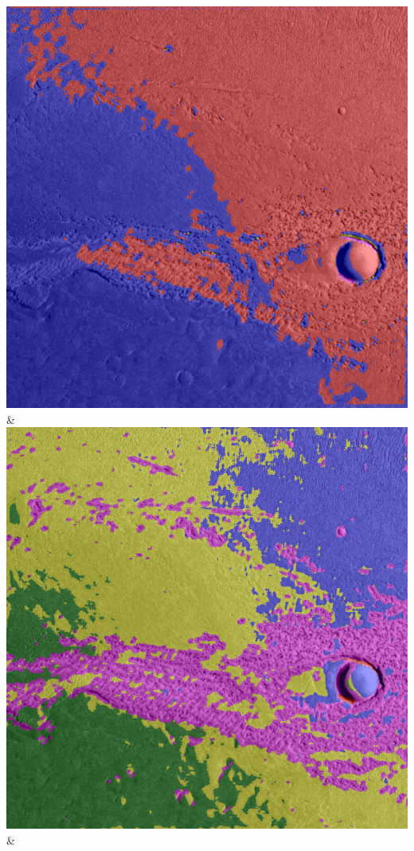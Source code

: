 \begin{table}[h!]
\begin{tabularx}{\textwidth}
		\includegraphics[width=0.9\linewidth]{images/gen/activation_functions/p03_02.png_None.png} &
		\includegraphics[width=0.9\linewidth]{images/gen/activation_functions/p03_02.png_relu.png} &

\end{tabularx}
\end{table}
